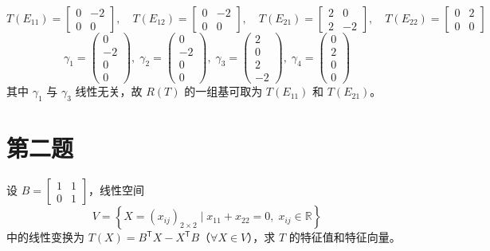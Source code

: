 \documentclass{article}
\begin{document}
\[
T(E_{11}) = \begin{bmatrix}0 & -2 \\ 0 & 0 \end{bmatrix},\quad
T(E_{12}) = \begin{bmatrix}0 & -2 \\ 0 & 0 \end{bmatrix},\quad
T(E_{21}) = \begin{bmatrix}2 & 0 \\ 2 & -2 \end{bmatrix},\quad
T(E_{22}) = \begin{bmatrix}0 & 2 \\ 0 & 0 \end{bmatrix}
\]
\[
\gamma_1=\begin{pmatrix} 0 \\ -2 \\ 0 \\ 0\end{pmatrix},\;
\gamma_2=\begin{pmatrix} 0 \\ -2 \\ 0 \\ 0\end{pmatrix},\;
\gamma_3=\begin{pmatrix} 2 \\ 0 \\ 2 \\ -2\end{pmatrix},\;
\gamma_4=\begin{pmatrix} 0 \\ 2 \\ 0 \\ 0\end{pmatrix}
\]
其中 $\gamma_1$ 与 $\gamma_3$ 线性无关，故 $R(T)$ 的一组基可取为 $T(E_{11})$ 和 $T(E_{21})$。

\newpage

\section{第二题}\noindent
设 $B = \begin{bmatrix} 1 & 1 \\ 0 & 1 \end{bmatrix}$，线性空间
\[
V = \left\{ X=(x_{ij})_{2\times2} \mid x_{11}+x_{22} = 0,\; x_{ij}\in \mathbb{R} \right\}
\]
中的线性变换为 $T(X)=B^{\mathsf{T}}X - X^{\mathsf{T}}B$（$\forall X \in V$），求 $T$ 的特征值和特征向量。
\end{document}
